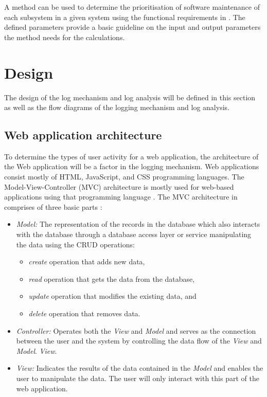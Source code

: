A method can be used to determine the prioritisation of software maintenance of each subsystem in a given system using the functional requirements in . The defined parameters provide a basic guideline on the input and output parameters the method needs for the calculations.

\clearpage

\section{Design}\label{sec:ch2_design}
The design of the log mechanism and log analysis will be defined in this section as well as the flow diagrams of the logging mechanism and log analysis.

\subsection{Web application architecture}\label{sec:ch2_webApplicationArchitecture}
To determine the types of user activity for a web application, the architecture of the Web application will be a factor in the logging mechanism. Web applications consist mostly of HTML, JavaScript, and CSS programming languages. The Model-View-Controller (MVC) architecture is mostly used for web-based applications using that programming language \cite{Jailia2016}. The MVC architecture in  comprises of three basic parts \cite{Jailia2016}:

\begin{itemize}
	\item \textit{Model:} The representation of the records in the database which also interacts with the database through a database access layer or service manipulating the data using the CRUD operations:
	\begin{itemize}
		\item \textit{create} operation that adds new data,
		\item \textit{read} operation that gets the data from the database,
		\item \textit{update} operation that modifies the existing data, and
		\item \textit{delete} operation that removes data.
	\end{itemize}
	\item \textit{Controller:} Operates both the \textit{View} and \textit{Model} and serves as the connection between the user and the system by controlling the data flow of the \textit{View}  and \textit{Model}.
	\textit{View}.
	\item \textit{View:} Indicates the results of the data contained in the \textit{Model} and enables the user to manipulate the data. The user will only interact with this part of the web application.
\end{itemize}

